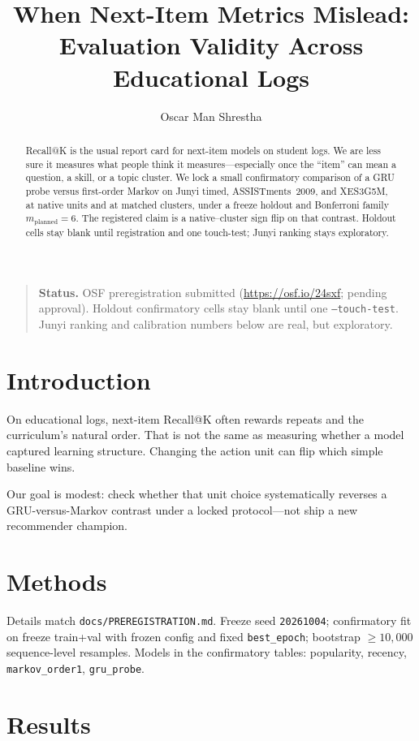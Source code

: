 \documentclass[11pt,a4paper]{article}
\title{When Next-Item Metrics Mislead:\\
Evaluation Validity Across Educational Logs}
\author{Oscar Man Shrestha}
\date{}
\begin{document}
\maketitle

\begin{quote}
\textbf{Status.} OSF preregistration submitted
(\url{https://osf.io/24sxf}; pending approval).
Holdout confirmatory cells stay blank until one \texttt{--touch-test}.
Junyi ranking and calibration numbers below are real, but exploratory.
\end{quote}

\begin{abstract}
Recall@K is the usual report card for next-item models on student logs.
We are less sure it measures what people think it measures---especially once
the ``item'' can mean a question, a skill, or a topic cluster.
We lock a small confirmatory comparison of a GRU probe versus first-order
Markov on Junyi timed, ASSISTments~2009, and XES3G5M, at native units and at
matched clusters, under a freeze holdout and Bonferroni family
\(m_{\mathrm{planned}}=6\).
The registered claim is a native--cluster sign flip on that contrast.
Holdout cells stay blank until registration and one touch-test; Junyi ranking
stays exploratory.
\end{abstract}

\section{Introduction}
On educational logs, next-item Recall@K often rewards repeats and the
curriculum's natural order. That is not the same as measuring whether a model
captured learning structure. Changing the action unit can flip which simple
baseline wins.

Our goal is modest: check whether that unit choice systematically reverses a
GRU-versus-Markov contrast under a locked protocol---not ship a new
recommender champion.

\section{Methods}
Details match \texttt{docs/PREREGISTRATION.md}. Freeze seed
\texttt{20261004}; confirmatory fit on freeze train+val with frozen config and
fixed \texttt{best\_epoch}; bootstrap \(\ge 10{,}000\) sequence-level
resamples. Models in the confirmatory tables: popularity, recency,
\texttt{markov\_order1}, \texttt{gru\_probe}.

\section{Results}
\end{document}
